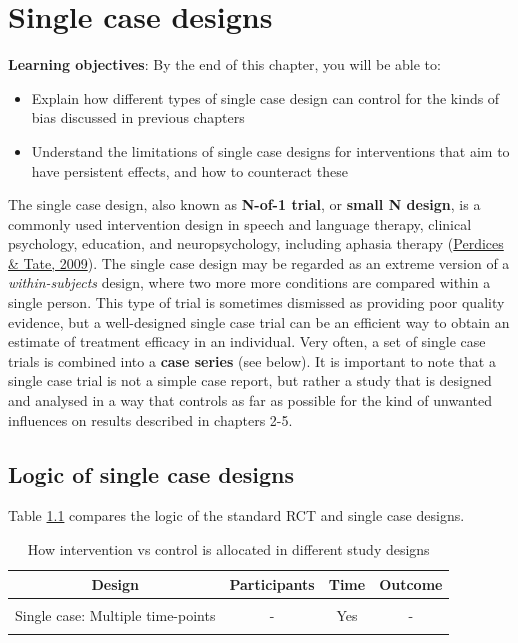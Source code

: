 \documentclass{krantz}
\begin{document}
\hypertarget{Single}{%
\chapter{Single case designs}\label{Single}}

\textbf{Learning objectives}: By the end of this chapter, you will be able to:

\begin{itemize}
\item
  Explain how different types of single case design can control for the kinds of bias discussed in previous chapters
\item
  Understand the limitations of single case designs for interventions that aim to have persistent effects, and how to counteract these
\end{itemize}

The single case design, also known as \textbf{N-of-1 trial}, or \textbf{small N design}, is a commonly used intervention design in speech and language therapy, clinical psychology, education, and neuropsychology, including aphasia therapy (\protect\hyperlink{ref-perdices2009}{Perdices \& Tate, 2009}). The single case design may be regarded as an extreme version of a \emph{within-subjects} design, where two more more conditions are compared within a single person. This type of trial is sometimes dismissed as providing poor quality evidence, but a well-designed single case trial can be an efficient way to obtain an estimate of treatment efficacy in an individual. Very often, a set of single case trials is combined into a \textbf{case series} (see below). It is important to note that a single case trial is not a simple case report, but rather a study that is designed and analysed in a way that controls as far as possible for the kind of unwanted influences on results described in chapters 2-5.

\hypertarget{logic-of-single-case-designs}{%
\section{Logic of single case designs}\label{logic-of-single-case-designs}}

Table \ref{tab:scdlogic} compares the logic of the standard RCT and single case designs.

\begin{table}

\caption{\label{tab:scdlogic}How intervention vs control is allocated in different study designs}
\centering
\begin{tabular}[t]{cccc}
\toprule
Design & Participants & Time & Outcome\\
\midrule
\cellcolor{gray!6}{RCT: Multiple participants} & \cellcolor{gray!6}{Yes} & \cellcolor{gray!6}{-} & \cellcolor{gray!6}{-}\\
Single case: Multiple time-points & - & Yes & -\\
\cellcolor{gray!6}{Single case: Multiple outcomes} & \cellcolor{gray!6}{-} & \cellcolor{gray!6}{-} & \cellcolor{gray!6}{Yes}\\
\bottomrule
\end{tabular}
\end{table}
\end{document}
